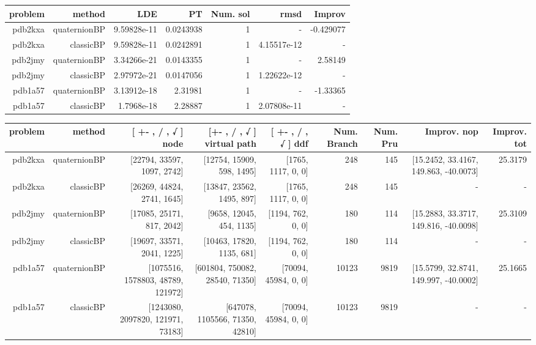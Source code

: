 \begin{table}
  \begin{tabular}{rrrrrrr}
    \hline\hline
    \textbf{problem} & \textbf{method} & \textbf{LDE} & \textbf{PT } & \textbf{Num. sol} & \textbf{rmsd} & \textbf{Improv} \\\hline
    pdb2kxa & quaternionBP & 9.59828e-11 & 0.0243938 & 1 &  -  & -0.429077 \\
    pdb2kxa & classicBP & 9.59828e-11 & 0.0242891 & 1 & 4.15517e-12 &  -  \\
    pdb2jmy & quaternionBP & 3.34266e-21 & 0.0143355 & 1 &  -  & 2.58149 \\
    pdb2jmy & classicBP & 2.97972e-21 & 0.0147056 & 1 & 1.22622e-12 &  -  \\
    pdb1a57 & quaternionBP & 3.13912e-18 & 2.31981 & 1 &  -  & -1.33365 \\
    pdb1a57 & classicBP & 1.7968e-18 & 2.28887 & 1 & 2.07808e-11 &  -  \\\hline\hline
  \end{tabular}
\end{table}
\begin{table}
  \begin{tabular}{rrrrrrrrr}
    \hline\hline
    \textbf{problem} & \textbf{method} & \textbf{ [ +- , / , √ ] node} & \textbf{ [+- , / , √ ] virtual path} & \textbf{ [ +- , / , √ ] ddf } & \textbf{ Num. Branch } & \textbf{ Num. Pru } & \textbf{Improv. nop} & \textbf{Improv. tot} \\\hline
    pdb2kxa & quaternionBP & [22794, 33597, 1097, 2742] & [12754, 15909, 598, 1495] & [1765, 1117, 0, 0] & 248 & 145 & [15.2452, 33.4167, 149.863, -40.0073] & 25.3179 \\
    pdb2kxa & classicBP & [26269, 44824, 2741, 1645] & [13847, 23562, 1495, 897] & [1765, 1117, 0, 0] & 248 & 145 &  -  &  -  \\
    pdb2jmy & quaternionBP & [17085, 25171, 817, 2042] & [9658, 12045, 454, 1135] & [1194, 762, 0, 0] & 180 & 114 & [15.2883, 33.3717, 149.816, -40.0098] & 25.3109 \\
    pdb2jmy & classicBP & [19697, 33571, 2041, 1225] & [10463, 17820, 1135, 681] & [1194, 762, 0, 0] & 180 & 114 &  -  &  -  \\
    pdb1a57 & quaternionBP & [1075516, 1578803, 48789, 121972] & [601804, 750082, 28540, 71350] & [70094, 45984, 0, 0] & 10123 & 9819 & [15.5799, 32.8741, 149.997, -40.0002] & 25.1665 \\
    pdb1a57 & classicBP & [1243080, 2097820, 121971, 73183] & [647078, 1105566, 71350, 42810] & [70094, 45984, 0, 0] & 10123 & 9819 &  -  &  -  \\\hline\hline
  \end{tabular}
\end{table}
